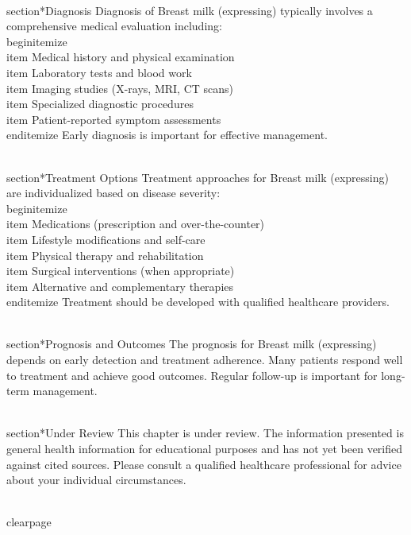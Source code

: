 \\section*{Diagnosis}
Diagnosis of Breast milk (expressing) typically involves a comprehensive medical evaluation including:
\\begin{itemize}
  \\item Medical history and physical examination
  \\item Laboratory tests and blood work
  \\item Imaging studies (X-rays, MRI, CT scans)
  \\item Specialized diagnostic procedures
  \\item Patient-reported symptom assessments
\\end{itemize}
Early diagnosis is important for effective management.

\\section*{Treatment Options}
Treatment approaches for Breast milk (expressing) are individualized based on disease severity:
\\begin{itemize}
  \\item Medications (prescription and over-the-counter)
  \\item Lifestyle modifications and self-care
  \\item Physical therapy and rehabilitation
  \\item Surgical interventions (when appropriate)
  \\item Alternative and complementary therapies
\\end{itemize}
Treatment should be developed with qualified healthcare providers.

\\section*{Prognosis and Outcomes}
The prognosis for Breast milk (expressing) depends on early detection and treatment adherence. Many patients respond well to treatment and achieve good outcomes. Regular follow-up is important for long-term management.

\\section*{Under Review}
This chapter is under review. The information presented is general health information for educational purposes and has not yet been verified against cited sources. Please consult a qualified healthcare professional for advice about your individual circumstances.

\\clearpage
